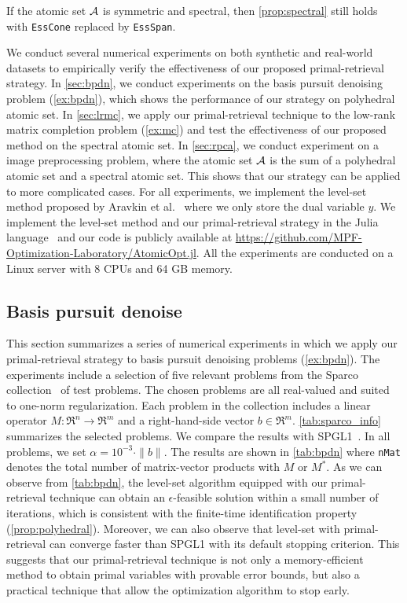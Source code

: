 \begin{corollary}
    If the atomic set $\mathcal{A}$ is symmetric and spectral, then \autoref{prop:spectral} still holds with \texttt{EssCone} replaced by \texttt{EssSpan}. 
\end{corollary}

We conduct several numerical experiments on both synthetic and real-world datasets to empirically verify the effectiveness of our proposed primal-retrieval strategy. In \autoref{sec:bpdn}, we conduct experiments on the basis pursuit denoising problem (\autoref{ex:bpdn}), which shows the performance of our strategy on polyhedral atomic set. In \autoref{sec:lrmc}, we apply our primal-retrieval technique to the low-rank matrix completion problem (\autoref{ex:mc}) and test the effectiveness of our proposed method on the spectral atomic set. In \autoref{sec:rpca}, we conduct experiment on 
a image preprocessing problem, where the atomic set $\mathcal{A}$ is the sum of a polyhedral atomic set and a spectral atomic set. This shows that our strategy can be applied to more complicated cases. For all experiments, we implement the level-set method proposed by Aravkin et al.~\cite{aravkin2016levelset} where we only store the dual variable $y$. We implement the level-set method and our primal-retrieval strategy in the Julia language~\cite{bezanson2017julia} and our code is publicly available at \url{https://github.com/MPF-Optimization-Laboratory/AtomicOpt.jl}. All the experiments are conducted on a Linux server with 8 CPUs and 64 GB memory. 

\subsection{Basis pursuit denoise} \label{sec:bpdn}

This section summarizes a series of numerical experiments in which we apply our primal-retrieval strategy to basis pursuit denoising problems (\autoref{ex:bpdn}). The experiments include a selection of five relevant problems from the Sparco collection~\cite{BergFrieHennHerrSaabYilm:2008} of test problems. The chosen problems are all real-valued and suited to one-norm regularization. Each problem in the collection includes a linear operator $M:\Re^n \to \Re^m$ and a right-hand-side vector $b \in \Re^m$. \autoref{tab:sparco_info} summarizes the selected problems. We compare the results with SPGL1~\cite{BergFriedlander:2008}. In all problems, we set $\alpha = 10^{-3}\cdot\|b\|$. The results are shown in \autoref{tab:bpdn} where \texttt{nMat} denotes the total number of matrix-vector products with $M$ or $M^*$. 
As we can observe from \autoref{tab:bpdn}, the level-set algorithm equipped with our primal-retrieval technique can obtain an $\epsilon$-feasible solution within a small number of iterations, which is consistent with the finite-time identification property (\autoref{prop:polyhedral}). Moreover, we can also observe that level-set with primal-retrieval can converge faster than SPGL1 with its default stopping criterion. This suggests that our primal-retrieval technique is not only a memory-efficient method to obtain primal variables with provable error bounds, but also a practical technique that allow the optimization algorithm to stop early.

